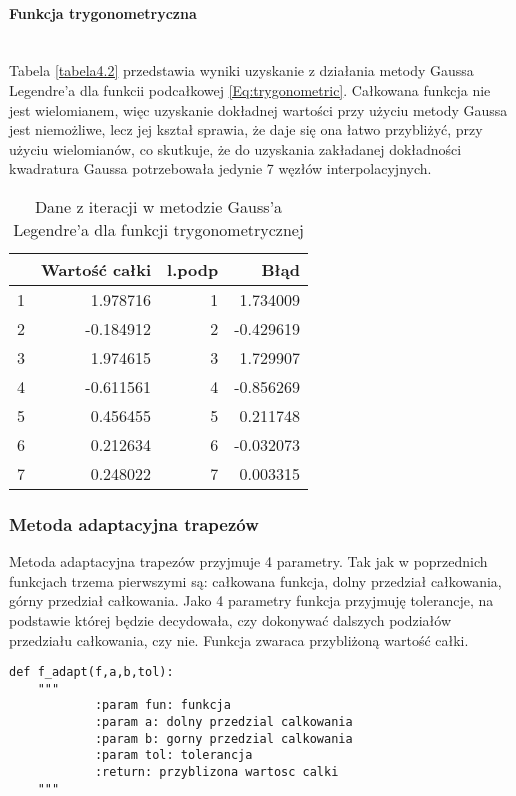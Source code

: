 \documentclass[12pt,twoside]{article}
\begin{document}
\paragraph{Funkcja trygonometryczna}\mbox{} \\

Tabela \eqref{tabela4.2} przedstawia wyniki uzyskanie z działania metody Gaussa Legendre'a dla funkcii podcałkowej \eqref{Eq:trygonometric}. Całkowana funkcja nie jest wielomianem, więc uzyskanie dokładnej wartości przy użyciu metody Gaussa jest niemożliwe, lecz jej kształ sprawia, że daje się ona łatwo przybliżyć, przy użyciu wielomianów, co skutkuje, że do uzyskania zakładanej dokładności kwadratura Gaussa potrzebowała jedynie 7 węzłów interpolacyjnych.

\begin{table}[H]
\centering
\caption{Dane z iteracji w metodzie Gauss'a Legendre'a dla funkcji trygonometrycznej}
\label{tabela4.2}
\begin{tabular}{lrrr}
\toprule
{} &  Wartość całki &  l.podp &      Błąd \\
\midrule
1 &       1.978716 &       1 &  1.734009 \\
2 &      -0.184912 &       2 & -0.429619 \\
3 &       1.974615 &       3 &  1.729907 \\
4 &      -0.611561 &       4 & -0.856269 \\
5 &       0.456455 &       5 &  0.211748 \\
6 &       0.212634 &       6 & -0.032073 \\
7 &       0.248022 &       7 &  0.003315 \\
\bottomrule
\end{tabular}
\end{table}

\subsubsection{Metoda adaptacyjna trapezów}

Metoda adaptacyjna trapezów przyjmuje 4 parametry. Tak jak w poprzednich funkcjach trzema pierwszymi są: całkowana funkcja, dolny przedział całkowania, górny przedział całkowania. Jako 4 parametry funkcja przyjmuję tolerancje, na podstawie której będzie decydowała, czy dokonywać dalszych podziałów przedziału całkowania, czy nie. Funkcja zwaraca przybliżoną wartość całki.
\begin{lstlisting}[caption={Kod w języku python implementujący metodę trapezów}]
def f_adapt(f,a,b,tol):
    """
    		:param fun: funkcja
            :param a: dolny przedzial calkowania
            :param b: gorny przedzial calkowania
            :param tol: tolerancja
            :return: przyblizona wartosc calki
    """
\end{lstlisting}
\label{Listing 10}
\end{document}
